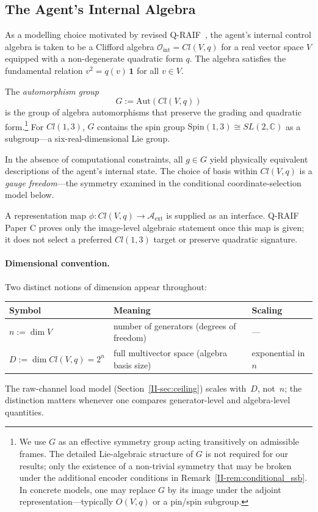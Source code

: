 \documentclass[12pt,a4paper,openany]{book}
\begin{document}
\subsection{The Agent's Internal Algebra}
\label{II-subsec:algebra}

As a modelling choice motivated by revised
Q-RAIF~\cite{Liu2026QRAIF_B,Liu2026QRAIF_C},
the agent's internal control algebra is taken to be a Clifford algebra
$\mathcal{O}_{\mathrm{int}} = Cl(V,q)$
for a real vector space $V$ equipped with a non-degenerate
quadratic form $q$.
The algebra satisfies the fundamental relation
$v^2 = q(v)\,\mathbf{1}$ for all $v \in V$.

The \emph{automorphism group}
\begin{equation}
\label{II-eq:gauge_group}
G := \mathrm{Aut}(Cl(V,q))
\end{equation}
is the group of algebra automorphisms that preserve the
grading and quadratic form.\footnote{\label{II-fn:gauge_group}%
We use $G$ as an effective symmetry group acting
transitively on admissible frames.
The detailed Lie-algebraic structure of $G$ is not required
for our results; only the existence of a non-trivial
symmetry that may be broken under the additional encoder
conditions in Remark~\ref{II-rem:conditional_ssb}.
In concrete models, one may replace $G$ by its image
under the adjoint representation---typically
$O(V,q)$ or a pin/spin subgroup.}
For $Cl(1,3)$, $G$ contains the spin group
$\mathrm{Spin}(1,3) \cong SL(2,\mathbb{C})$
as a subgroup---a six-real-dimensional Lie group.

In the absence of computational constraints, all
$g \in G$ yield physically equivalent descriptions of
the agent's internal state.
The choice of basis within $Cl(V,q)$ is a \emph{gauge
freedom}---the symmetry examined in the conditional
coordinate-selection model below.

A representation map
$\phi:Cl(V,q)\to\mathcal A_{\mathrm{ext}}$ is supplied as an
interface.  Q-RAIF Paper C proves only the image-level algebraic
statement once this map is given; it does not select a preferred
$Cl(1,3)$ target or preserve quadratic signature.

\paragraph{Dimensional convention.}
Two distinct notions of dimension appear throughout:
\begin{center}
\small
\begin{tabular}{@{}lll@{}}
\toprule
Symbol & Meaning & Scaling \\
\midrule
$n := \dim V$ & number of generators
  (degrees of freedom) & --- \\
$D := \dim Cl(V,q) = 2^n$ & full multivector space
  (algebra basis size) & exponential in $n$ \\
\bottomrule
\end{tabular}
\end{center}
The raw-channel load model (Section~\ref{II-sec:ceiling})
scales with~$D$, not~$n$; the distinction matters
whenever one compares generator-level and
algebra-level quantities.
\end{document}
